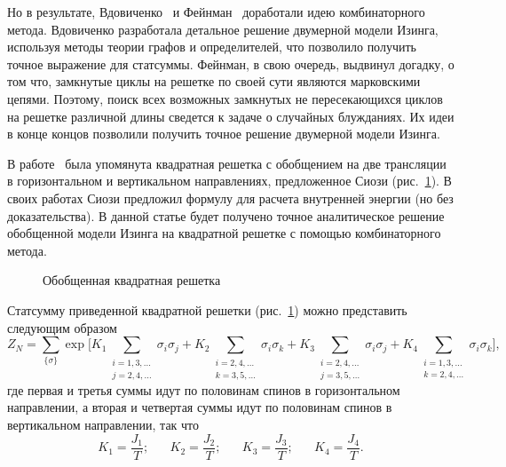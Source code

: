 \documentclass[utf8,12pt]{jetp}
\begin{document}
Но в результате, Вдовиченко~\cite{vdovichenko1964, vdovichenko1965} и Фейнман~\cite{feynman1972} доработали идею комбинаторного метода. Вдовиченко разработала детальное решение двумерной модели Изинга, используя методы теории графов и определителей, что позволило получить точное выражение для статсуммы. Фейнман, в свою очередь, выдвинул догадку, о том что, замкнутые циклы на решетке по своей сути являются марковскими цепями. Поэтому, поиск всех возможных замкнутых не пересекающихся циклов на решетке различной длины сведется к задаче о случайных блужданиях. Их идеи в конце концов позволили получить точное решение двумерной модели Изинга.

В работе~\cite{generalizedIsing2021} была упомянута квадратная решетка с обобщением на две трансляции в горизонтальном и вертикальном направлениях, предложенное Сиози (рис.~\ref{gen}). В своих работах Сиози \cite{syozi1972} предложил формулу для расчета внутренней энергии (но без доказательства). В данной статье будет получено точное аналитическое решение обобщенной модели Изинга на квадратной решетке с помощью комбинаторного метода.

\begin{figure}[h]
	\caption{Обобщенная квадратная решетка}
	\label{gen}
\end{figure}

Статсумму приведенной квадратной решетки (рис.~\ref{gen}) можно представить следующим образом 
\begin{equation}
Z_{N} = \sum_{\{\sigma\}} \exp{\bigg[ K_1 \sum_{\substack{i = 1,3,\dots \\ j = 2,4,\dots}} \sigma_i \sigma_j + K_2 \sum_{\substack{i = 2,4,\dots \\ k = 3,5,\dots}} \sigma_i \sigma_k + K_3 \sum_{\substack{i = 2,4,\dots \\ j = 3,5,\dots}} \sigma_i \sigma_j + K_4 \sum_{\substack{i = 1,3,\dots \\ k = 2,4,\dots}} \sigma_i \sigma_k\bigg]},
\end{equation}
где первая и третья суммы идут по половинам спинов в горизонтальном направлении,  а вторая и четвертая суммы идут по половинам спинов в вертикальном направлении, так что
\begin{equation*}
K_1 = \frac{J_1}{T}; \;\;\;\;\;\; K_2 = \frac{J_2}{T};\;\;\;\;\;\; K_3 = \frac{J_3}{T};\;\;\;\;\;\;K_4 = \frac{J_4}{T}.
\end{equation*}
\end{document}

